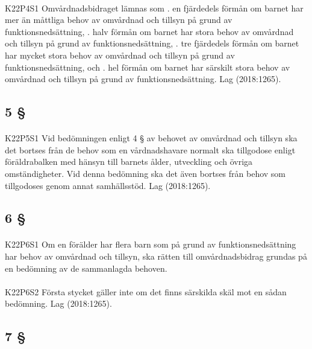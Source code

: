 \documentclass[a4paper,notitlepage,openany,10pt]{book}
\begin{document}
\paragraph*{}
{\tiny K22P4S1}
Omvårdnadsbidraget lämnas som
. en fjärdedels förmån om barnet har mer än måttliga behov av omvårdnad och tillsyn på grund av funktionsnedsättning,
. halv förmån om barnet har stora behov av omvårdnad och tillsyn på grund av funktionsnedsättning,
. tre fjärdedels förmån om barnet har mycket stora behov av omvårdnad och tillsyn på grund av funktionsnedsättning, och
. hel förmån om barnet har särskilt stora behov av omvårdnad och tillsyn på grund av funktionsnedsättning.
Lag (2018:1265).
\subsection*{5 §}
\paragraph*{}
{\tiny K22P5S1}
Vid bedömningen enligt 4 § av behovet av omvårdnad och tillsyn ska det bortses från de behov som en vårdnadshavare normalt ska tillgodose enligt föräldrabalken med hänsyn till barnets ålder, utveckling och övriga omständigheter. Vid denna bedömning ska det även bortses från behov som tillgodoses genom annat samhällsstöd.
Lag (2018:1265).
\subsection*{6 §}
\paragraph*{}
{\tiny K22P6S1}
Om en förälder har flera barn som på grund av funktionsnedsättning har behov av omvårdnad och tillsyn, ska rätten till omvårdnadsbidrag grundas på en bedömning av de sammanlagda behoven.
\paragraph*{}
{\tiny K22P6S2}
Första stycket gäller inte om det finns särskilda skäl mot en sådan bedömning.
Lag (2018:1265).
\subsection*{7 §}
\end{document}
